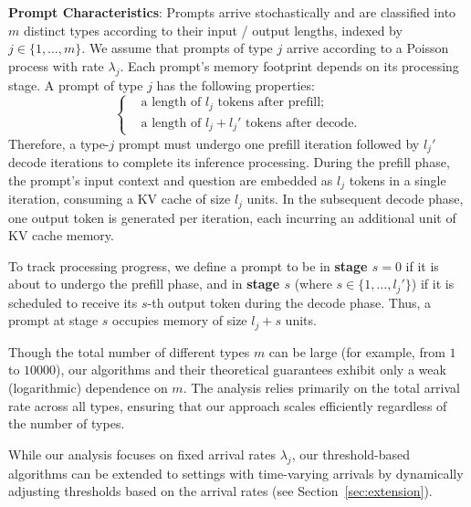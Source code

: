 \textbf{Prompt Characteristics}: Prompts arrive stochastically and are classified into \( m \) distinct types according to their input / output lengths, indexed by \( j \in \{1, \dots, m\} \). We assume that prompts of type \( j \) arrive according to a Poisson process with rate \( \lambda_j \).
Each prompt's memory footprint depends on its processing stage. A prompt of type \( j \) has the following properties:
\begin{equation*}
    \left\{
    \begin{aligned}
        &\text{a length of } l_j \text{ tokens after prefill;}\\
        &\text{a length of } l_j + l_j' \text{ tokens after decode.}
    \end{aligned}
    \right.
\end{equation*}
Therefore, a type-$j$ prompt must undergo one prefill iteration followed by $l_j'$ decode iterations to complete its inference processing. During the prefill phase, the prompt's input context and question are embedded as $l_j$ tokens in a single iteration, consuming a KV cache of size $l_j$ units. In the subsequent decode phase, one output token is generated per iteration, each incurring an additional unit of KV cache memory.

To track processing progress, we define a prompt to be in \textbf{stage $s=0$} if it is about to undergo the prefill phase, and in \textbf{stage $s$} (where $s \in \{1, \dots, l_j'\}$) if it is scheduled to receive its $s$-th output token during the decode phase. Thus, a prompt at stage $s$ occupies memory of size $l_j + s$ units.

Though the total number of different types $m$ can be large (for example, from $1$ to $10000$), our algorithms and their theoretical guarantees exhibit only a weak (logarithmic) dependence on $m$. The analysis relies primarily on the total arrival rate across all types, ensuring that our approach scales efficiently regardless of the number of types.

While our analysis focuses on fixed arrival rates $\lambda_j$, our threshold-based algorithms can be extended to settings with time-varying arrivals by dynamically adjusting thresholds based on the arrival rates (see Section~\ref{sec:extension}).



